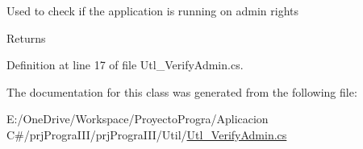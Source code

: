 Used to check if the application is running on admin rights 

\begin{DoxyReturn}{Returns}

\end{DoxyReturn}


Definition at line 17 of file Utl\+\_\+\+Verify\+Admin.\+cs.



The documentation for this class was generated from the following file\+:\begin{DoxyCompactItemize}
\item 
E\+:/\+One\+Drive/\+Workspace/\+Proyecto\+Progra/\+Aplicacion C\#/prj\+Progra\+I\+I\+I/prj\+Progra\+I\+I\+I/\+Util/\hyperlink{_utl___verify_admin_8cs}{Utl\+\_\+\+Verify\+Admin.\+cs}\end{DoxyCompactItemize}
